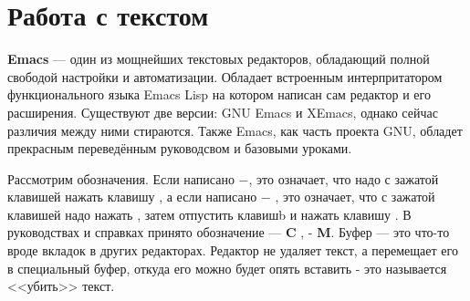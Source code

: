 \section{Работа с текстом}\label{base:software:text}
\textbf{Emacs} --- один из мощнейших текстовых редакторов, обладающий полной свободой настройки и автоматизации. Обладает встроенным интерпритатором функционального языка Emacs Lisp на котором написан сам редактор и его расширения. Существуют две версии: GNU Emacs и XEmacs, однако сейчас различия между ними стираются. Также Emacs, как часть проекта GNU, обладет прекрасным переведённым руководсвом и базовыми уроками.

Рассмотрим обозначения. Если написано \Ctrl$-$, это означает, что надо с зажатой клавишей \Ctrl нажать клавишу , а если написано \Ctrl$-$ , это означает, что с зажатой клавишей \Ctrl надо нажать , затем отпустить клавишb и нажать клавишу . В руководствах и справках принято обозначение \Ctrl --- \textbf{C} , \Alt - \textbf{M}. Буфер --- это что-то вроде вкладок в других редакторах. Редактор не удаляет текст, а перемещает его в специальный буфер, откуда его можно будет опять вставить - это называется <<убить>> текст.


